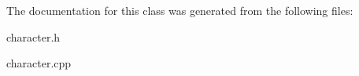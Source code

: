 The documentation for this class was generated from the following files\-:\begin{DoxyCompactItemize}
\item 
character.\-h\item 
character.\-cpp\end{DoxyCompactItemize}
